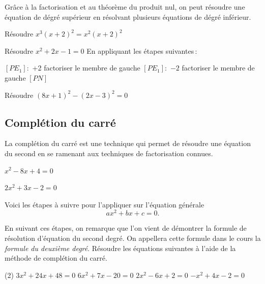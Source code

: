 \documentclass[a4paper,12pt]{article}
\begin{document}
Grâce à la factorisation et au théorème du produit nul, on peut résoudre une équation de dégré supérieur en résolvant plusieurs équations de dégré inférieur.

\begin{exemple}
	Résoudre $x^3(x+2)^2=x^2(x+2)^2$
	\tcblower
	\vspace{10cm}

\end{exemple}

\begin{exemple}
	Résoudre $x^2+2x-1=0$
	\tcblower
	En appliquant les étapes suivantes\,:

	\begin{tasks}
\task $\left[P E_1\right]:$ +2
\vspace{1.5cm}
\task factoriser le membre de gauche
\vspace{1.5cm}
\task $\left[P E_1\right]:$ $-2$
\vspace{1.5cm}
\task factoriser le membre de gauche
\vspace{1.5cm}
\task $\left[P N\right]$
\vspace{1.5cm}
	\end{tasks}
\end{exemple}

\begin{exemple}
	Résoudre $(8x+1)^2-(2x-3)^2=0$
	\tcblower
	\vspace{11cm}	
\end{exemple}
\newpage
\subsection{Complétion du carré}
La complétion du carré est une technique qui permet de résoudre une équation du second en se ramenant aux techniques de factorisation connues.
\begin{exemple}
	$x^2-8x+4=0$
	\tcblower
	\vspace{10cm}	

\end{exemple}

\begin{exemple}
	$2x^2+3x-2=0$
	\tcblower
	\vspace{10cm}	

\end{exemple}
\newpage
Voici les étapes à suivre pour l'appliquer sur l'équation générale 
\[ax^2+bx+c=0.\]
	\vspace{20cm}

En suivant ces étapes, on remarque que l'on vient de démontrer la formule de résolution d'équation du second degré. On appellera cette formule dans le cours la \emph{formule du deuxième degré}.
Résoudre les équations suivantes à l'aide de la méthode de complétion du carré.
\begin{tasks}(2)
 \task $3 x^2+24 x+48=0$
 \task $6 x^2+7 x-20=0$
 \task $2 x^2-6 x+2=0$
 \task $-x^2+4 x-2=0$
\end{tasks}
\end{document}
